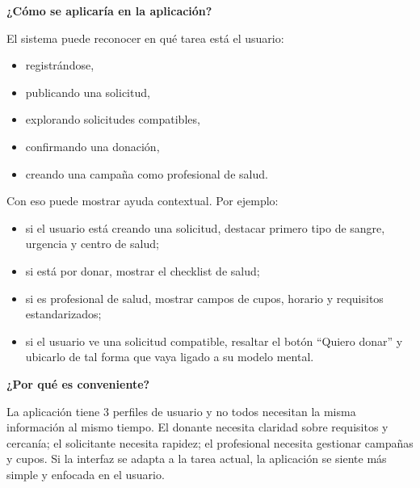 \medskip
\noindent\textbf{¿Cómo se aplicaría en la aplicación?}

El sistema puede reconocer en qué tarea está el usuario:

\begin{itemize}
    \item registrándose,
    \item publicando una solicitud,
    \item explorando solicitudes compatibles,
    \item confirmando una donación,
    \item creando una campaña como profesional de salud.
\end{itemize}

Con eso puede mostrar ayuda contextual. Por ejemplo:

\begin{itemize}
    \item si el usuario está creando una solicitud, destacar primero tipo de sangre, urgencia y centro de salud;
    \item si está por donar, mostrar el checklist de salud;
    \item si es profesional de salud, mostrar campos de cupos, horario y requisitos estandarizados;
    \item si el usuario ve una solicitud compatible, resaltar el botón ``Quiero donar'' y ubicarlo de tal forma que vaya ligado a su modelo mental.
\end{itemize}

\medskip
\noindent\textbf{¿Por qué es conveniente?}

La aplicación tiene 3 perfiles de usuario y no todos necesitan la misma información al mismo tiempo. El donante necesita claridad sobre requisitos y cercanía; el solicitante necesita rapidez; el profesional necesita gestionar campañas y cupos. Si la interfaz se adapta a la tarea actual, la aplicación se siente más simple y enfocada en el usuario.
